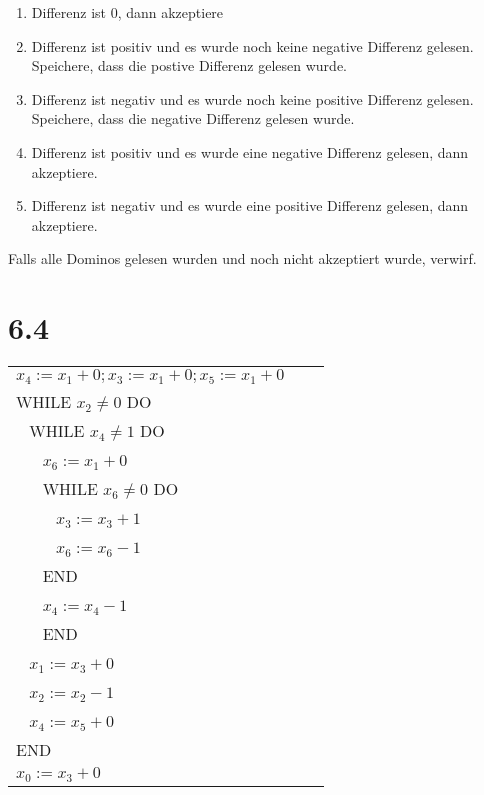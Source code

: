 \documentclass{article}
\begin{document}
\begin{itemize}
	\begin{enumerate}
	\item Differenz ist 0, dann akzeptiere
	\item Differenz ist positiv und es wurde noch keine negative Differenz gelesen. Speichere, dass die postive Differenz gelesen wurde.
	\item Differenz ist negativ und es wurde noch keine positive Differenz gelesen. Speichere, dass die negative Differenz gelesen wurde.
	\item Differenz ist positiv und es wurde eine negative Differenz gelesen, dann akzeptiere. 
	\item Differenz ist negativ und es wurde eine positive Differenz gelesen, dann akzeptiere.
	\end{enumerate}
	Falls alle Dominos gelesen wurden und noch nicht akzeptiert wurde, verwirf.	
\end{itemize}

\section{6.4}


\begin{tabular}{l l r}
$x_4:=x_1+0;x_3:= x_1+0;x_5:= x_1+0$\\
WHILE $x_2 \neq 0$ DO\\
~ WHILE $x_4 \neq 1$ DO\\
~ ~ $x_6:= x_1 + 0$\\
~ ~ WHILE $x_6 \neq 0$ DO\\
~ ~ ~ $x_3:= x_3 + 1$\\
~ ~ ~ $x_6:= x_6 - 1$\\
~ ~ END\\
~ ~ $x_4:= x_4 - 1$\\
~ ~ END\\
~ $x_1:= x_3 + 0$\\
~ $x_2:= x_2 - 1$\\
~ $x_4:= x_5 + 0$\\
END\\
$x_0:= x_3 + 0$\\
\end{tabular}
	
\end{document}
